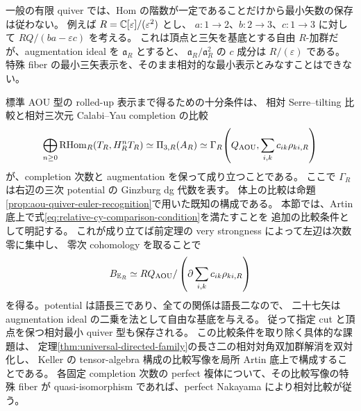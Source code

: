 \begin{remark}
\label{rem:relative-quiver-not-automatic}
一般の有限 quiver では、Hom の階数が一定であることだけから最小矢数の保存は従わない。
例えば $R=\mathbb C[\varepsilon]/(\varepsilon^2)$ とし、
$a:1\to2$、$b:2\to3$、$c:1\to3$ に対して
$RQ/(ba-\varepsilon c)$ を考える。
これは頂点と三矢を基底とする自由 $R$-加群だが、augmentation ideal を $\mathfrak a_R$ とすると、
$\mathfrak a_R/\mathfrak a_R^2$ の $c$ 成分は $R/(\varepsilon)$ である。
特殊 fiber の最小三矢表示を、そのまま相対的な最小表示とみなすことはできない。

標準 AOU 型の rolled-up 表示まで得るための十分条件は、
相対 Serre--tilting 比較と相対三次元 Calabi--Yau completion の比較
\begin{equation}\label{eq:relative-cy-comparison-condition}
 \bigoplus_{n\ge0}\operatorname{RHom}_R(T_R,H_R^nT_R)
 \simeq\Pi_{3,R}(A_R)
 \simeq\Gamma_R\!\left(Q_{\rm AOU},\sum_{i,k}c_{ik}\rho_{ki,R}\right)
\end{equation}
が、completion 次数と augmentation を保って成り立つことである。
ここで $\Gamma_R$ は右辺の三次 potential の Ginzburg dg 代数を表す。
体上の比較は命題\ref{prop:aou-quiver-euler-recognition}で用いた既知の構成である。
本節では、Artin 底上で式\eqref{eq:relative-cy-comparison-condition}を満たすことを
追加の比較条件として明記する。
これが成り立てば前定理の very strongness によって左辺は次数零に集中し、
零次 cohomology を取ることで
\[
 B_{\mathbb E_R}\simeq
 RQ_{\rm AOU}/\left(\partial\sum_{i,k}c_{ik}\rho_{ki,R}\right)
\]
を得る。potential は語長三であり、全ての関係は語長二なので、
二十七矢は augmentation ideal の二乗を法として自由な基底を与える。
従って指定 cut と頂点を保つ相対最小 quiver 型も保存される。
この比較条件を取り除く具体的な課題は、
定理\ref{thm:universal-directed-family}の長さ二の相対対角双加群解消を双対化し、
Keller の tensor-algebra 構成の比較写像を局所 Artin 底上で構成することである。
各固定 completion 次数の perfect 複体について、その比較写像の特殊 fiber が
quasi-isomorphism であれば、perfect Nakayama により相対比較が従う。
\end{remark}

